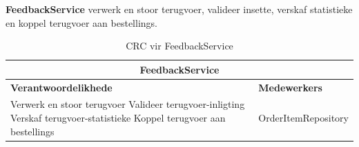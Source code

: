 \textbf{FeedbackService} verwerk en stoor terugvoer, valideer insette, verskaf statistieke en koppel terugvoer aan bestellings.
\begin{table}[H]
\centering
\begin{tabular}{|p{}|p{}|}
    \hline
    \multicolumn{2}{|c|}{\textbf{FeedbackService}} \\
    \hline
    \textbf{Verantwoordelikhede} & \textbf{Medewerkers} \\
    \hline
    Verwerk en stoor terugvoer \newline
    Valideer terugvoer-inligting \newline
    Verskaf terugvoer-statistieke \newline
    Koppel terugvoer aan bestellings
    &
    OrderItemRepository \\
    \hline
\end{tabular}
\caption{CRC vir FeedbackService}
\label{tab:crc_feedback_service}
\end{table}